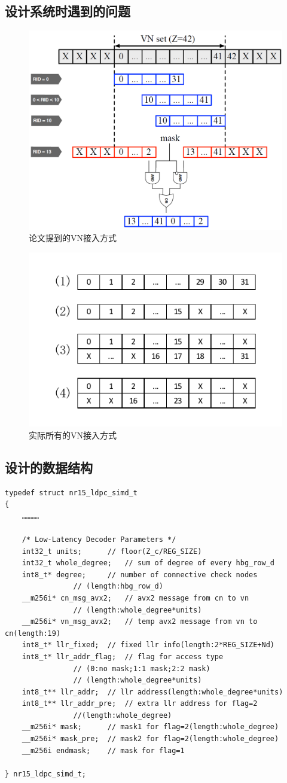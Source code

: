 \documentclass{article}
\begin{document}
\subsection{设计系统时遇到的问题}
\begin{figure}[H]
	\centering
	\includegraphics[width = .75\textwidth]{vn.png}
	\caption{论文提到的VN接入方式}
\end{figure}
\begin{figure}[H]
	\centering
	\includegraphics[width = .7\textwidth]{masktype.pdf}
	\caption{实际所有的VN接入方式}
\end{figure}
\subsection{设计的数据结构}
\lstset{language=C++}
\begin{lstlisting}
typedef struct nr15_ldpc_simd_t
{
	…………

	/* Low-Latency Decoder Parameters */
	int32_t units;		// floor(Z_c/REG_SIZE)
	int32_t whole_degree;	// sum of degree of every hbg_row_d
	int8_t* degree;		// number of connective check nodes
				// (length:hbg_row_d)
	__m256i* cn_msg_avx2;	// avx2 message from cn to vn
				// (length:whole_degree*units)
	__m256i* vn_msg_avx2;	// temp avx2 message from vn to cn(length:19)
	int8_t* llr_fixed;	// fixed llr info(length:2*REG_SIZE+Nd)
	int8_t* llr_addr_flag;	// flag for access type
				// (0:no mask;1:1 mask;2:2 mask)
				// (length:whole_degree*units)
	int8_t** llr_addr;	// llr address(length:whole_degree*units)
	int8_t** llr_addr_pre;	// extra llr address for flag=2
				//(length:whole_degree)
	__m256i* mask;		// mask1 for flag=2(length:whole_degree)
	__m256i* mask_pre;	// mask2 for flag=2(length:whole_degree)
	__m256i endmask;	// mask for flag=1

} nr15_ldpc_simd_t;
\end{lstlisting}
\end{document}
